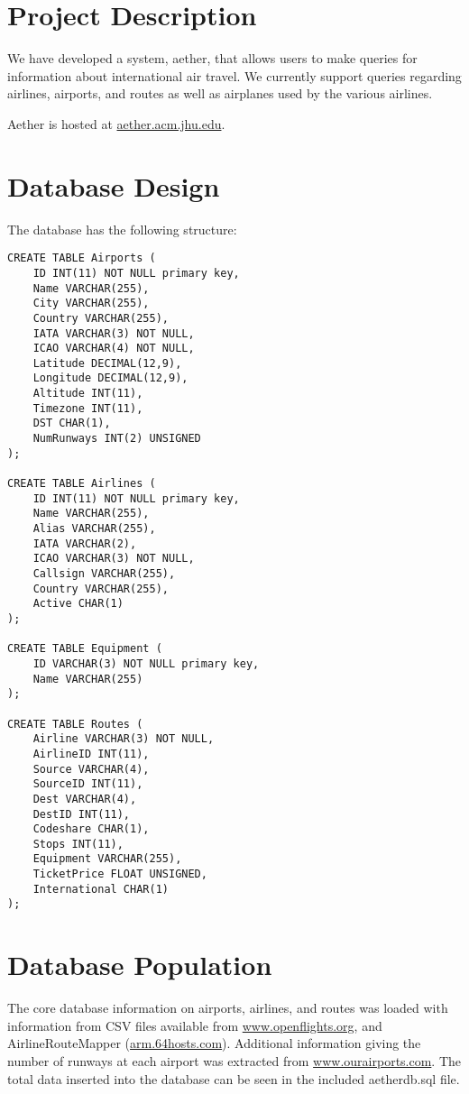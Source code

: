 %
%
%
%
%
%

\maketitle

\tableofcontents

\section{Project Description}
	We have developed a system, aether, that allows users to make queries for information about international air travel. We currently support queries regarding airlines, airports, and routes as well as airplanes used by the various airlines.
		
\indent Aether is hosted at \url{aether.acm.jhu.edu}.

\section{Database Design}
	The database has the following structure:
    
\begin{verbatim}
CREATE TABLE Airports (
    ID INT(11) NOT NULL primary key,
    Name VARCHAR(255),
    City VARCHAR(255),
    Country VARCHAR(255),
    IATA VARCHAR(3) NOT NULL,
    ICAO VARCHAR(4) NOT NULL,
    Latitude DECIMAL(12,9),
    Longitude DECIMAL(12,9),
    Altitude INT(11),
    Timezone INT(11),
    DST CHAR(1),
    NumRunways INT(2) UNSIGNED
);
    
CREATE TABLE Airlines (
    ID INT(11) NOT NULL primary key,
    Name VARCHAR(255),
    Alias VARCHAR(255),
    IATA VARCHAR(2),
    ICAO VARCHAR(3) NOT NULL,
    Callsign VARCHAR(255),
    Country VARCHAR(255),
    Active CHAR(1)
);

CREATE TABLE Equipment ( 
    ID VARCHAR(3) NOT NULL primary key,
    Name VARCHAR(255)
);
    
CREATE TABLE Routes (
    Airline VARCHAR(3) NOT NULL,
    AirlineID INT(11),
    Source VARCHAR(4),
    SourceID INT(11),
    Dest VARCHAR(4),
    DestID INT(11),
    Codeshare CHAR(1),
    Stops INT(11),
    Equipment VARCHAR(255),
    TicketPrice FLOAT UNSIGNED,
    International CHAR(1)
);
\end{verbatim}

\section{Database Population}
	The core database information on airports, airlines, and routes was loaded with information from CSV files available from \url{www.openflights.org}, and AirlineRouteMapper (\url{arm.64hosts.com}). Additional information giving the number of runways at each airport was extracted from \mbox{\url{www.ourairports.com}}. The total data inserted into the database can be seen in the included aetherdb.sql file.

